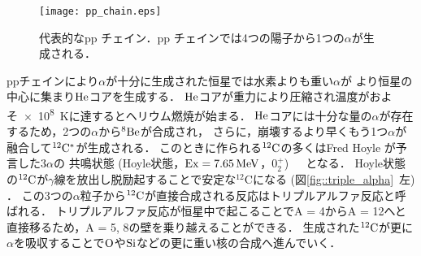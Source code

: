 \documentclass[../master]{subfiles}
\begin{document}
\begin{figure}
  \centering
  \texttt{[image: pp\_chain.eps]}
  \caption{代表的なpp チェイン．pp チェインでは4つの陽子から1つの$\alpha$が生成される．}
  \label{fig::pp_chain}
\end{figure}

ppチェインにより$\alpha$が十分に生成された恒星では水素よりも重い$\alpha$が
より恒星の中心に集まり${\rm He}$コアを生成する．
${\rm He}$コアが重力により圧縮され温度がおよそ\SI{e8}{\kelvin}に達するとヘリウム燃焼が始まる．
${\rm He}$コアには十分な量の$\alpha$が存在するため，2つの$\alpha$から${}^{8}{\rm Be}$が合成され，
さらに，崩壊するより早くもう1つ$\alpha$が融合して${}^{12}{\rm C}^{*}$が生成される．
このときに作られる${}^{12}{\rm C}$の多くはFred Hoyle が予言した$3\alpha$の
共鳴状態 (Hoyle状態，${\rm Ex} = \SI{7.65}{\mega\electronvolt}$，$0_{2}^{+}$)~\cite{hoyle_state}　となる．
Hoyle状態の${}^{12}{\rm C}$が$\gamma$線を放出し脱励起することで安定な${}^{12}\mathrm{C}$になる
 (図\ref{fig::triple_alpha}~左) ．
この3つの$\alpha$粒子から${}^{12}{\rm C}$が直接合成される反応はトリプルアルファ反応と呼ばれる．
トリプルアルファ反応が恒星中で起こることでA = 4からA = 12へと直接移るため，A = 5, 8の壁を乗り越えることができる．
生成された${}^{12}{\rm C}$が更に$\alpha$を吸収することで${\rm O}$や${\rm Si}$などの更に重い核の合成へ進んでいく．
\end{document}
